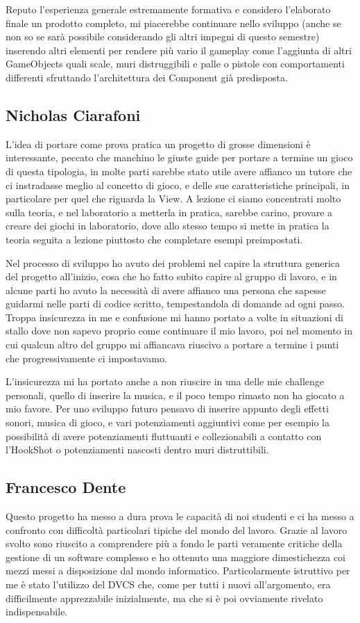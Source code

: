 \documentclass[a4paper,12pt]{report}
\begin{document}
Reputo l'esperienza generale estremamente formativa e considero l'elaborato finale un prodotto completo, mi piacerebbe continuare nello sviluppo (anche se non so se sarà possibile considerando gli altri impegni di questo semestre) inserendo altri elementi per rendere più vario il gameplay come l'aggiunta di altri GameObjects quali scale, muri distruggibili e palle o pistole con comportamenti differenti sfruttando l'architettura dei Component già predisposta. 

\subsection*{Nicholas Ciarafoni}
L'idea di portare come prova pratica un progetto di grosse dimensioni è interessante, peccato che manchino le giuste guide per portare a termine un gioco di questa tipologia, in molte parti sarebbe stato utile avere affianco un tutore che ci instradasse meglio al concetto di gioco, e delle sue caratteristiche principali, in particolare per quel che riguarda la View.
A lezione ci siamo concentrati molto sulla teoria, e nel laboratorio a metterla in pratica, sarebbe carino, provare a creare dei giochi in laboratorio, dove allo stesso tempo si mette in pratica la teoria seguita a lezione piuttosto che completare esempi preimpostati.

Nel processo di sviluppo ho avuto dei problemi nel capire la struttura generica del progetto all'inizio, cosa che ho fatto subito capire al gruppo di lavoro, e in alcune parti ho avuto la necessità di avere affianco una persona che sapesse guidarmi nelle parti di codice scritto, tempestandola di domande ad ogni passo.
Troppa insicurezza in me e confusione mi hanno portato a volte in situazioni di stallo dove non sapevo proprio come continuare il mio lavoro, poi nel momento in cui qualcun altro del gruppo mi affiancava riuscivo a portare a termine i punti che progressivamente ci impostavamo.

L'insicurezza mi ha portato anche a non riuscire in una delle mie challenge personali, quello di inserire la musica, e il poco tempo rimasto non ha giocato a mio favore.
Per uno sviluppo futuro pensavo di inserire appunto degli effetti sonori, musica di gioco, e vari potenziamenti aggiuntivi come per esempio la possibilità di avere potenziamenti fluttuanti e collezionabili a contatto con l'HookShot o potenziamenti nascosti dentro muri distruttibili.

\subsection*{Francesco Dente}
Questo progetto ha messo a dura prova le capacità di noi studenti e ci ha messo a confronto con difficoltà particolari tipiche del mondo del lavoro.
Grazie al lavoro svolto sono riuscito a comprendere più a fondo le parti veramente critiche della gestione di un software complesso e ho ottenuto una maggiore dimestichezza coi mezzi messi a disposizione dal mondo informatico.
Particolarmente istruttivo per me è stato l'utilizzo del DVCS che, come per tutti i nuovi all'argomento, era difficilmente apprezzabile inizialmente, ma che si è poi ovviamente rivelato indispensabile.
\end{document}
